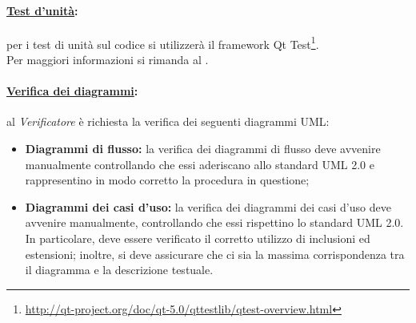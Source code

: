 \paragraph{\underline{Test d'unità}:}
per i test di unità sul codice si utilizzerà il framework\glossario{} Qt Test\footnote{\url{http://qt-project.org/doc/qt-5.0/qttestlib/qtest-overview.html}}.
\\Per maggiori informazioni si rimanda al \PdQ{}.

\paragraph{\underline{Verifica dei diagrammi}:}
al \textit{Verificatore} è richiesta la verifica dei seguenti diagrammi UML\g{}:
\begin{itemize}
\item \textbf{Diagrammi di flusso:} la verifica dei diagrammi di flusso deve avvenire manualmente controllando che essi aderiscano allo standard UML\g{} 2.0 e rappresentino in modo corretto la procedura in questione;
\item \textbf{Diagrammi dei casi d'uso:} la verifica dei diagrammi dei casi d'uso deve avvenire manualmente, controllando che essi rispettino lo standard UML\g{} 2.0. In particolare, deve essere verificato il corretto utilizzo di inclusioni ed estensioni; inoltre, si deve assicurare che ci sia la massima corrispondenza tra il diagramma e la descrizione testuale.
\end{itemize}


